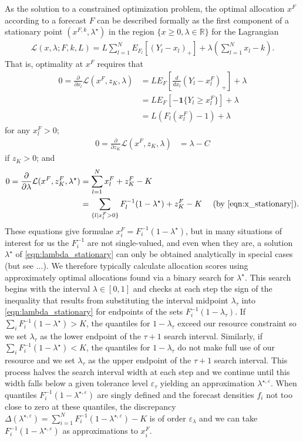 \documentclass{article}
\begin{document}
As the solution to a constrained optimization problem, the optimal allocation $x^F$ according to a forecast $F$ can be described formally as the first component of a stationary point $(x^{F,k}, \lambda^{\star})$ in the region $\{x \geq 0, \lambda \in \mathbb{R}\}$ for the Lagrangian 
\begin{align}
\mathcal{L}(x, \lambda; F, k, L) = L\sum_{l=1}^{N} E_{F_l}[(Y_l - x_l)_{+}] + \lambda\left(\sum_{l=1}^{N} x_l - k\right).
\end{align}
That is, optimality at $x^F$ requires that
\begin{align}
0 = \frac{\partial}{\partial x_l} \mathcal{L}(x^F, z_K, \lambda) &= L E_F \left[\frac{d}{dx_l}(Y_l - x_l^F)_{+}\right] + \lambda \\
& = L E_F \left[-\mathbf{1}\{Y_l \geq x_l^F\}\right] + \lambda \\
& = L(F_l(x_l^F)-1) + \lambda \label{eqn:x_stationary}
\end{align}
for any $x_l^F > 0$;
\begin{align}
0 = \frac{\partial}{\partial z_K} \mathcal{L}(x^F, z_K, \lambda) &= \lambda - C
\end{align}
if $z_K>0$; and
\begin{align}
0 = \frac{\partial {} }{\partial {\lambda}} \mathcal{L}(x^F, z_K^F, \lambda^{\star}) &= \sum_{l=1}^{N} x_l^F + z_K^F - K\\
& = \sum_{\{l | x_l^F > 0\}} F_{l}^{-1}(1-\lambda^{\star}) + z_K^F - K \quad \text{ (by \eqref{eqn:x_stationary})}. \label{eqn:lambda_stationary}
\end{align}
These equations give formulae $x_i^F = F_i^{-1}(1-\lambda^{\star})$, but in many situations of interest for us the $F_i^{-1}$ are not single-valued, and even 
when they are, a solution $\lambda^{\star}$ of \eqref{eqn:lambda_stationary} can only be obtained analytically in special cases (but see ...). We therefore typically calculate allocation scores using approximately optimal allocations found via a binary search for $\lambda^{\star}$.  This search begins with the interval $\lambda \in [0,1]$ and 
checks at each step the sign of the inequality that results from substituting the interval midpoint $\lambda_{\tau}$ into \eqref{eqn:lambda_stationary} for endpoints of the sets $F_i^{-1}(1-\lambda_{\tau})$.  If $\sum_{i} F_{i}^{-1}(1-\lambda^{\star}) > K$, the quantiles for $1-\lambda_{\tau}$ exceed our resource constraint so we set $\lambda_{\tau}$ as the lower endpoint of the $\tau + 1$ search interval.  Similarly, if $\sum_{i} F_{i}^{-1}(1-\lambda^{\star}) < K$, the quantiles for 
$1-\lambda_{\tau}$ do not make full use of our resource and we set $\lambda_{\tau}$ as the upper endpoint of the $\tau + 1$ search interval.  This process halves the search interval width at each step and we continue until this width falls below a given tolerance level $\varepsilon_{\tau}$ yielding an 
approximation $\lambda^{\star, \varepsilon}$. When quantiles $F_i^{-1}(1-\lambda^{\star, \varepsilon})$ are singly defined and the forecast densities $f_i$
not too close to zero at these quantiles, the discrepancy $\Delta(\lambda^{\star, \varepsilon})  = \sum_{i=1}^{N} F_{i}^{-1}(1-\lambda^{\star, \varepsilon}) - K$ is of order $\varepsilon_{\lambda}$ and we can take $F_{i}^{-1}(1-\lambda^{\star, \varepsilon})$ as approximations to $x_i^F$.
\end{document}
